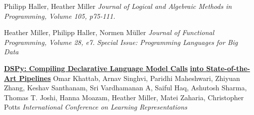 \documentclass[9pt]{article}
\begin{document}
\bigskip


\newline\noindent Philipp Haller, Heather Miller
\newline\noindent\emph{Journal of Logical and Algebraic Methods in Programming, Volume 105, p75-111.}
\bigskip

\newline{}
\newline\noindent Heather Miller, Philipp Haller, Normen M\"{u}ller
\newline\noindent\emph{Journal of Functional Programming, Volume 28, e7.}
\newline\noindent\emph{Special Issue: Programming Languages for Big Data}
\bigskip



\bigskip


\noindent\href{https://openreview.net/forum?id=sY5N0zY5Od}{\bf DSPy: Compiling Declarative Language Model Calls}\vspace{-0.03in}
\newline\noindent\href{https://openreview.net/forum?id=sY5N0zY5Od}{\bf into State-of-the-Art Pipelines}
\newline\noindent Omar Khattab, Arnav Singhvi, Paridhi Maheshwari, Zhiyuan Zhang,\vspace{-0.03in} 
\newline\noindent Keshav Santhanam, Sri Vardhamanan A, Saiful Haq, Ashutosh Sharma,\vspace{-0.03in} 
\newline\noindent Thomas T. Joshi, Hanna Moazam, Heather Miller, Matei Zaharia, Christopher Potts
\newline\noindent\emph{International Conference on Learning Representations}
\bigskip
\end{document}
